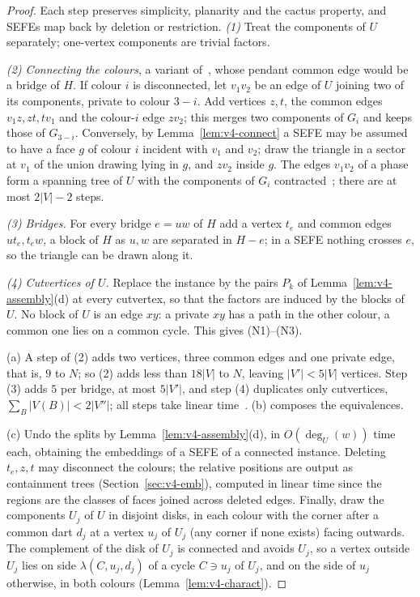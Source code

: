 \begin{proof}
Each step preserves simplicity, planarity and the cactus property, and
SEFEs map back by deletion or restriction. \emph{(1)} Treat the components of
$U$ separately; one-vertex components are trivial factors.

\emph{(2) Connecting the colours}, a variant of~\cite[Section~2]{BR15},
whose pendant common edge would be a bridge of $H$. If colour $i$ is
disconnected, let $v_1v_2$ be an edge of $U$ joining two of its components,
private to colour $3-i$. Add vertices $z,t$, the common edges
$v_1z,zt,tv_1$ and the colour-$i$ edge $zv_2$; this merges two components
of $G_i$ and keeps those of $G_{3-i}$. Conversely, by
Lemma~\ref{lem:v4-connect} a SEFE may be assumed to have a face $g$ of
colour $i$ incident with $v_1$ and $v_2$; draw the triangle in a sector at
$v_1$ of the union drawing lying in $g$, and $zv_2$ inside $g$. The edges
$v_1v_2$ of a phase form a spanning tree of $U$ with the components of $G_i$
contracted~\cite[Theorem~1]{BR15}; there are at most $2|V|-2$ steps.

\emph{(3) Bridges.} For every bridge $e=uw$ of $H$ add a vertex $t_e$ and
common edges $ut_e,t_ew$, a block of $H$ as $u,w$ are separated in $H-e$;
in a SEFE nothing crosses $e$, so the triangle can be drawn along it.

\emph{(4) Cutvertices of $U$.} Replace the instance by the pairs $P_k$ of
Lemma~\ref{lem:v4-assembly}(d) at every cutvertex, so that the factors are
induced by the blocks of $U$. No block of $U$ is an edge $xy$: a private
$xy$ has a path in the other colour, a common one lies on a common cycle.
This gives (N1)--(N3).

(a) A step of (2) adds two vertices, three common edges and one private
edge, that is, $9$ to $N$; so (2) adds less than $18|V|$ to $N$, leaving
$|V'|<5|V|$ vertices. Step (3) adds $5$ per bridge, at most $5|V'|$, and
step (4) duplicates only cutvertices,
$\sum_B|V(B)|<2|V''|$; all steps take linear time~\cite{Tar72}. (b) composes
the equivalences.

(c) Undo the splits by Lemma~\ref{lem:v4-assembly}(d), in $O(\deg_U(w))$
time each, obtaining the embeddings of a SEFE of a connected instance.
Deleting $t_e,z,t$ may disconnect the colours; the relative positions are
output as containment trees (Section~\ref{sec:v4-emb}), computed in linear
time since the regions are the classes of faces joined across deleted
edges. Finally, draw the components $U_j$ of $U$ in disjoint disks, in each
colour with the corner after a common dart $d_j$ at a vertex $u_j$ of $U_j$
(any corner if none exists) facing outwards. The complement of the disk of
$U_j$ is connected and avoids $U_j$, so a vertex outside $U_j$ lies on side
$\lambda(C,u_j,d_j)$ of a cycle $C\ni u_j$ of $U_j$, and on the side of $u_j$
otherwise, in both colours (Lemma~\ref{lem:v4-charact}).
\end{proof}
